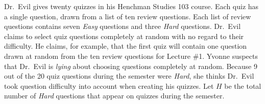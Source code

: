 \documentclass[addpoints,12pt]{exam}
\begin{document}
\begin{questions}


\question Dr.\ Evil gives twenty quizzes in his Henchman Studies 103 course.
Each quiz has a single question, drawn from a list of ten review questions.
Each list of review questions contains seven \emph{Easy} questions and three \emph{Hard} questions.
Dr.\ Evil claims to select quiz questions completely at random with no regard to their difficulty.
He claims, for example, that the first quiz will contain one question drawn at random from the ten review questions for Lecture \#1.
Yvonne suspects that Dr.\ Evil is \emph{lying} about choosing questions completely at random.
Because 9 out of the 20 quiz questions during the semester were \emph{Hard}, she thinks Dr.\ Evil took question difficulty into account when creating his quizzes.
Let $H$ be the total number of \emph{Hard} questions that appear on quizzes during the semester.
\begin{parts}

\end{parts}
\end{questions}
\end{document}
